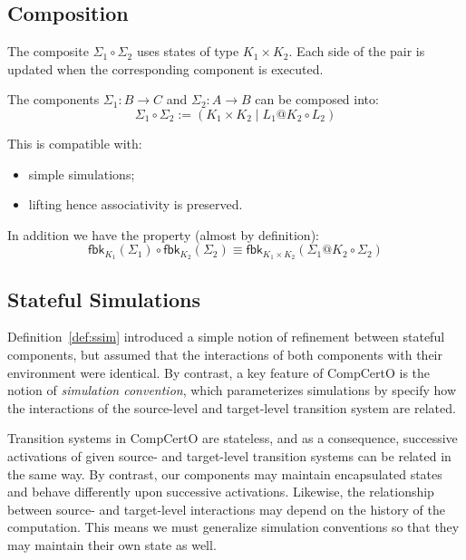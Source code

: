 \documentclass[acmsmall,screen,review,anonymous]{acmart}
\newcommand{\kw}[1]{\ensuremath{ \mathsf{#1} }}
\begin{document}

\subsection{Composition} %

The composite $\Sigma_1 \circ \Sigma_2$
uses states of type $K_1 \times K_2$.
Each side of the pair is updated
when the corresponding component is executed.

\begin{definition}[Linking]
The components
$\Sigma_1 : B \rightarrow C$ and
$\Sigma_2 : A \rightarrow B$
can be composed into:
\[
  \Sigma_1 \circ \Sigma_2 :=
    ( K_1 \times K_2 \mid L_1@K_2 \circ L_2 )
\]
\end{definition}

\begin{lemma}
  This is compatible with:
  \begin{itemize}
    \item simple simulations;
    \item lifting hence associativity is preserved.
  \end{itemize}
  In addition we have the property (almost by definition):
  \[
    \kw{fbk}_{K_1}(\Sigma_1) \circ \kw{fbk}_{K_2}(\Sigma_2) \equiv
    \kw{fbk}_{K_1 \times K_2}(\Sigma_1@K_2 \circ \Sigma_2)
  \]
\end{lemma}


\subsection{Stateful Simulations} %

Definition~\ref{def:ssim} introduced a simple notion of refinement
between stateful components,
but assumed that the interactions of both components
with their environment were identical.
By contrast, a key feature of CompCertO
is the notion of \emph{simulation convention},
which parameterizes simulations by
specify how the interactions of
the source-level and target-level transition system
are related.

Transition systems in CompCertO are stateless,
and as a consequence,
successive activations of given
source- and target-level
transition systems can be related in the same way.
By contrast,
our components may maintain encapsulated states
and behave differently upon successive activations.
Likewise,
the relationship between source- and target-level interactions
may depend on the history of the computation.
This means we must generalize simulation conventions
so that they may maintain their own state as well.
\end{document}
